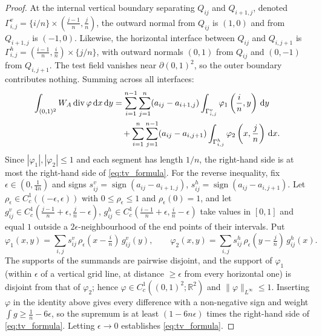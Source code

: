 \documentclass[11pt,a4paper,reqno]{amsart}
\theoremstyle{definition}
\numberwithin{equation}{section}
\newcommand{\R}{\mathbb{R}}
\newcommand{\dif}{\,\mathrm{d}}
\begin{document}
\begin{proof}
At the internal vertical boundary separating $Q_{ij}$ and $Q_{i+1, j}$, denoted $\Gamma_{i, j}^v = \{i/n\} \times (\frac{j-1}{n}, \frac{j}{n})$, the outward normal from $Q_{ij}$ is $(1, 0)$ and from $Q_{i+1, j}$ is $(-1, 0)$. Likewise, the horizontal interface between $Q_{ij}$ and $Q_{i,j+1}$ is $\Gamma_{i, j}^h = (\frac{i-1}{n}, \frac{i}{n}) \times \{j/n\}$, with outward normals $(0,1)$ from $Q_{ij}$ and $(0,-1)$ from $Q_{i,j+1}$. The test field vanishes near $\partial(0,1)^2$, so the outer boundary contributes nothing. Summing across all interfaces:
\begin{align}
    \int_{(0,1)^2} W_A \operatorname{div} \varphi \dif x \dif y 
    &= \sum_{i=1}^{n-1} \sum_{j=1}^n (a_{ij} - a_{i+1, j}) \int_{\Gamma_{i,j}^v} \varphi_1\left(\frac{i}{n}, y\right) \dif y \notag \\
    &\quad + \sum_{i=1}^n \sum_{j=1}^{n-1} (a_{ij} - a_{i, j+1}) \int_{\Gamma_{i,j}^h} \varphi_2\left(x, \frac{j}{n}\right) \dif x.
\end{align}
Since $|\varphi_1|, |\varphi_2| \le 1$ and each segment has length $1/n$, the right-hand side is at most the right-hand side of \eqref{eq:tv_formula}. For the reverse inequality, fix $\epsilon \in (0, \frac{1}{4n})$ and signs $s^v_{ij} = \operatorname{sign}(a_{ij} - a_{i+1,j})$, $s^h_{ij} = \operatorname{sign}(a_{ij} - a_{i,j+1})$. Let $\rho_\epsilon \in C_c^1((-\epsilon, \epsilon))$ with $0 \le \rho_\epsilon \le 1$ and $\rho_\epsilon(0) = 1$, and let $g^v_{ij} \in C_c^1(\frac{j-1}{n} + \epsilon, \frac{j}{n} - \epsilon)$, $g^h_{ij} \in C_c^1(\frac{i-1}{n} + \epsilon, \frac{i}{n} - \epsilon)$ take values in $[0,1]$ and equal $1$ outside a $2\epsilon$-neighbourhood of the end points of their intervals. Put
\[
\varphi_1(x,y) = \sum_{i,j} s^v_{ij}\, \rho_\epsilon(x - \tfrac{i}{n})\, g^v_{ij}(y), \qquad \varphi_2(x,y) = \sum_{i,j} s^h_{ij}\, \rho_\epsilon(y - \tfrac{j}{n})\, g^h_{ij}(x).
\]
The supports of the summands are pairwise disjoint, and the support of $\varphi_1$ (within $\epsilon$ of a vertical grid line, at distance $\ge \epsilon$ from every horizontal one) is disjoint from that of $\varphi_2$; hence $\varphi \in C_c^1((0,1)^2;\R^2)$ and $\|\varphi\|_{L^\infty} \le 1$. Inserting $\varphi$ in the identity above gives every difference with a non-negative sign and weight $\int g \ge \frac{1}{n} - 6\epsilon$, so the supremum is at least $(1 - 6n\epsilon)$ times the right-hand side of \eqref{eq:tv_formula}. Letting $\epsilon \to 0$ establishes \eqref{eq:tv_formula}.
\end{proof}
\end{document}

